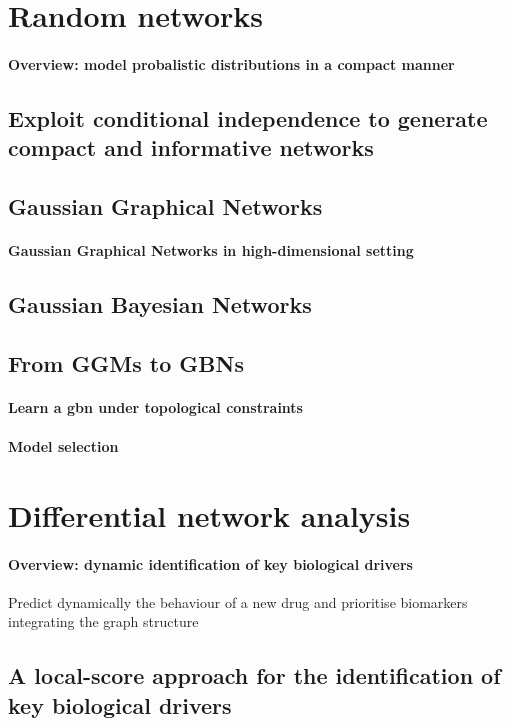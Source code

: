 \section{Random networks}
\paragraph{Overview: model probalistic distributions in a compact manner}
\subsection{Exploit conditional independence to generate compact and informative networks}
\subsection{Gaussian Graphical Networks}
\paragraph{Gaussian Graphical Networks in high-dimensional setting}
\subsection{Gaussian Bayesian Networks}
\subsection{From GGMs to GBNs}
\paragraph{Learn a \gls{gbn} under topological constraints}
\paragraph{Model selection}


\section{Differential network analysis}

\paragraph{Overview: dynamic identification of key biological drivers}
Predict dynamically the behaviour of a new drug and prioritise biomarkers integrating the graph structure
\subsection{A local-score approach for the identification of key biological drivers}





